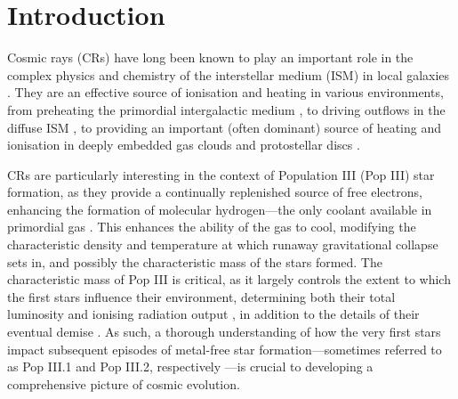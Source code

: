\section{Introduction}
\label{intro}

Cosmic rays (CRs) have long been known to play an important role in the complex physics and chemistry of the interstellar medium (ISM) in local galaxies \citep{GlassgoldLanger1973,GoldsmithLanger1978,CravensDalgarno1978,MannheimSchlickeiser1994,DalgarnoYanLiu1999}.  They are an effective source of ionisation and heating in various environments, from preheating the primordial intergalactic medium  \citep[IGM;][]{SazonovSunyaev2015}, to driving outflows in the diffuse ISM \citep[e.g.,][]{Ensslinetal2007,Jubelgasetal2008,SalemBryan2014,Hanaszetal2013,Boothetal2013,SalemBryanHummels2014}, to providing an important (often dominant) source of heating and ionisation in deeply embedded gas clouds and protostellar discs \citep{IndrioloFieldsMcCall2009,PadovaniGalliGlassgold2009,PadovaniHennebelleGalli2013,Padovanietal2015,GlassgoldGalliPadovani2012}. 

CRs are particularly interesting in the context of Population III (Pop III) star formation, as they provide a continually replenished source of free electrons, enhancing the formation of molecular hydrogen---the only coolant available in primordial gas \citep{Abeletal1997,GalliPalla1998,BrommCoppiLarson2002}.  This enhances the ability of the gas to cool, modifying the characteristic density and temperature at which runaway gravitational collapse sets in, and possibly the characteristic mass of the stars formed.   The characteristic mass of Pop III is critical, as it largely controls the extent to which the first stars influence their environment, determining both their total luminosity and ionising radiation output \citep{Schaerer2002}, in addition to the details of their eventual demise \citep{Hegeretal2003,HegerWoosley2010,MaederMeynet2012}. As such, a thorough understanding of how the very first stars impact subsequent episodes of metal-free star formation---sometimes referred to as Pop III.1 and Pop III.2, respectively \citep{McKeeTan2008}---is crucial to developing a comprehensive picture of cosmic evolution.

